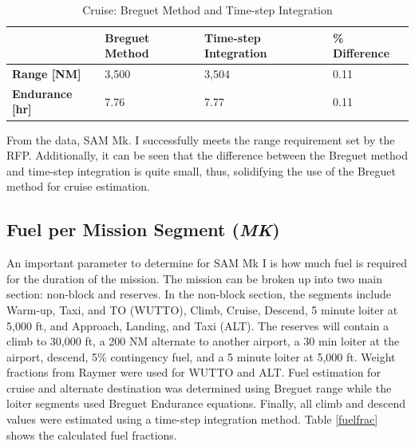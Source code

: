 \begin{table}[!h]
    \centering
    \caption{Cruise: Breguet Method and Time-step Integration}
    \begin{tabular}{|p{1in}|p{1in}|p{1.5in}|p{1in}|}\toprule 
     & \textbf{Breguet Method} & \textbf{Time-step Integration} & \textbf{\% Difference} \\ \hline \hline
    \textbf{Range [NM]} & 3,500 & 3,504 & 0.11 \\ \hline
    \textbf{Endurance [hr]} & 7.76 & 7.77 & 0.11 \\ 
    \bottomrule
    \end{tabular}
    \label{tab:cruise}
\end{table}

From the data, SAM Mk. I successfully meets the range requirement set by the RFP. Additionally, it can be seen that the difference between the Breguet method and time-step integration is quite small, thus, solidifying the use of the Breguet method for cruise estimation. 

\subsection{Fuel per Mission Segment (\textit{MK})}
An important parameter to determine for SAM Mk I is how much fuel is required for the duration of the mission. The mission can be broken up into two main section: non-block and reserves. In the non-block section, the segments include Warm-up, Taxi, and TO (WUTTO), Climb, Cruise, Descend, 5 minute loiter at 5,000 ft, and Approach, Landing, and Taxi (ALT). The reserves will contain a climb to 30,000 ft, a 200 NM alternate to another airport, a 30 min loiter at the airport, descend, 5\% contingency fuel, and a 5 minute loiter at 5,000 ft. Weight fractions from Raymer\cite{raymer} were used for WUTTO and ALT. Fuel estimation for cruise and alternate destination was determined using Breguet range while the loiter segments used Breguet Endurance equations. Finally, all climb and descend values were estimated using a time-step integration method. Table \ref{fuelfrac} shows the calculated fuel fractions. 

